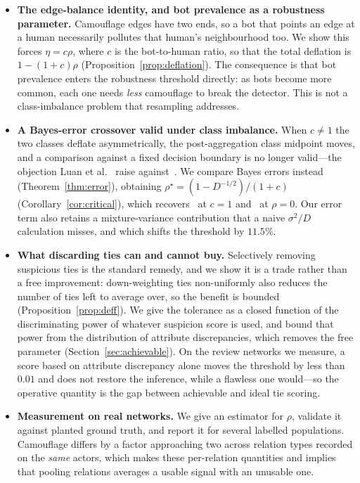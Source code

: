 \documentclass[onecolumn,pdflatex,sn-basic,Numbered]{sn-jnl}
\theoremstyle{thmstyleone}
\theoremstyle{thmstylethree}
\begin{document}
\begin{itemize}
    \item \textbf{The edge-balance identity, and bot prevalence as a robustness
    parameter.} Camouflage edges have two ends, so a bot that points an edge at a
    human necessarily pollutes that human's neighbourhood too. We show this forces
    $\eta = c\rho$, where $c$ is the bot-to-human ratio, so that the total deflation
    is $1-(1+c)\rho$ (Proposition~\ref{prop:deflation}). The consequence is that
    bot prevalence enters the robustness threshold directly: as bots become more
    common, each one needs \emph{less} camouflage to break the detector. This is not
    a class-imbalance problem that resampling addresses.

    \item \textbf{A Bayes-error crossover valid under class imbalance.} When
    $c \neq 1$ the two classes deflate asymmetrically, the post-aggregation class
    midpoint moves, and a comparison against a fixed decision boundary is no longer
    valid---the objection Luan et al.~\citep{luan2023when} raise
    against~\citep{ma2022homophily}. We compare Bayes errors instead
    (Theorem~\ref{thm:error}), obtaining
    $\rho^\star = (1 - D^{-1/2})/(1+c)$ (Corollary~\ref{cor:critical}), which
    recovers~\citep{ma2022homophily} at $c=1$ and~\citep{baranwal2021graph} at
    $\rho=0$. Our error term also retains a mixture-variance contribution that a
    naive $\sigma^2/D$ calculation misses, and which shifts the threshold by $11.5\%$.

    \item \textbf{What discarding ties can and cannot buy.} Selectively removing
    suspicious ties is the standard remedy, and we show it is a trade rather than a
    free improvement: down-weighting ties non-uniformly also reduces the number of
    ties left to average over, so the benefit is bounded
    (Proposition~\ref{prop:deff}). We give the tolerance as a closed function of the
    discriminating power of whatever suspicion score is used, and bound that power
    from the distribution of attribute discrepancies, which removes the free parameter
    (Section~\ref{sec:achievable}). On the review networks we measure, a score based on
    attribute discrepancy alone moves the threshold by less than $0.01$ and does not
    restore the inference, while a flawless one would---so the operative quantity is
    the gap between achievable and ideal tie scoring.

    \item \textbf{Measurement on real networks.} We give an estimator for $\rho$,
    validate it against planted ground truth, and report it for several labelled
    populations. Camouflage differs by a factor approaching two across relation types
    recorded on the \emph{same} actors, which makes these per-relation quantities and
    implies that pooling relations averages a usable signal with an unusable one.
\end{itemize}
\end{document}
